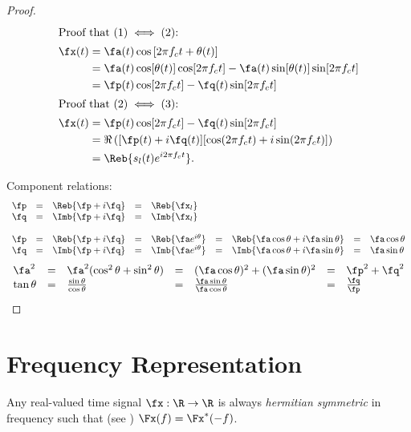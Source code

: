 \begin{proof}

\begin{align*}
  \intertext{Proof that $(1) \iff (2)$: }
   \fx(t)
     &= \fa(t)\cos\left[ 2\pi f_c t + \theta(t) \right]
   \\&= \fa(t)\cos[\theta(t)]\cos[2\pi f_c t] -\fa(t)\sin[\theta(t)]\sin[2\pi f_c t]
   \\&= \fp(t)\cos[2\pi f_c t] -\fq(t)\sin[2\pi f_c t]
  \\
  \intertext{Proof that $(2) \iff (3)$: }
  \fx(t)
    &= \fp(t)\cos[2\pi f_c t] -\fq(t)\sin[2\pi f_c t]
  \\&= \Re\left( [\fp(t)+i\fq(t)][\cos(2\pi f_c t) + i\sin(2\pi f_c t)]\right)
  \\&= \Reb{s_l(t)e^{i2\pi f_c t}}.
\end{align*}

Component relations:
\[\begin{array}{*{12}{l}}
   \fp
     &=& \Reb{\fp + i\fq}
     &=& \Reb{\fx_l}
\\
   \fq
     &=& \Imb{\fp + i\fq}
     &=& \Imb{\fx_l}
\\ \\
   \fp
     &=& \Reb{\fp + i\fq}
     &=& \Reb{\fa e^{i\theta}}
     &=& \Reb{\fa\cos\theta + i\fa\sin\theta}
     &=& \fa\cos\theta
\\
   \fq
     &=& \Imb{\fp + i\fq}
     &=& \Imb{\fa e^{i\theta}}
     &=& \Imb{\fa\cos\theta + i\fa\sin\theta}
     &=& \fa\sin\theta
\end{array}\]
\[\begin{array}{*{12}{l}}
   \fa^2
     &=& \fa^2 (\cos^2\theta + \sin^2\theta)
     &=& (\fa \cos\theta)^2 + (\fa\sin\theta)^2
     &=& \fp^2 + \fq^2
\\
   \tan\theta
     &=& \frac{\sin\theta}{\cos\theta}
     &=& \frac{\fa\sin\theta}{\fa\cos\theta}
     &=& \frac{\fq}{\fp}
\end{array}\]

\end{proof}


\section{Frequency Representation}
Any real-valued time signal $\fx:\R\to\R$
is always {\em hermitian symmetric} in frequency
such that (see )
$\Fx(f) =  \Fx^\ast(-f)$.


